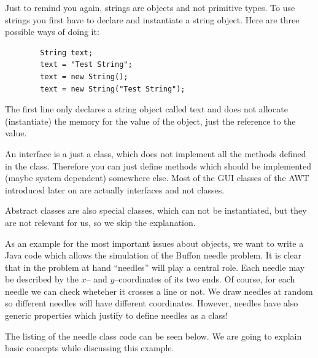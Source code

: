 Just to remind you again, strings are objects and not primitive 
types. To use strings you first have to declare and instantiate a string
object. Here are three possible ways of doing it:
\begin{verbatim}
        String text;
        text = "Test String";
        text = new String();
        text = new String("Test String");
\end{verbatim}
The first line only declares a string object called text and does not
allocate (instantiate) the memory for the value of the object, just
the reference to the value.

An interface is a just a class, which does not implement all the
methods defined in the class. Therefore you can just define methods
which should be implemented (maybe system dependent) somewhere else.
Most of the GUI classes of the AWT introduced later on are
actually interfaces and not classes.

Abstract classes are also special classes, which can not be instantiated,
but they are not relevant for us, so we skip the explanation.

As an example for the most important issues about objects, we want to
write a Java code which allows the simulation of the Buffon needle
problem. It is clear that in the problem at hand ``needles'' will play
a central role. Each needle may be described by the $x$-- and
$y$--coordinates of  its two ends. Of course, for each needle we can
check wheteher it crosses a line or not. We draw needles at random so
different needles will have different coordinates. However, needles
have also generic properties which justify to define needles as a class!


The listing of the needle class code can be seen below. We are going
to explain basic concepts while discussing this example.


